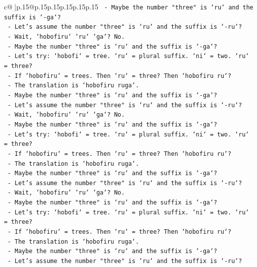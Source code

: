 \documentclass{article}
\begin{document}
{\begin{supertabular}{c@{$\;$}|p{.15\linewidth}@{}p{.15\linewidth}p{.15\linewidth}p{.15\linewidth}p{.15\linewidth}p{.15\linewidth}}
{{{\texttt{    {-} Maybe the number "three" is `ru` and the suffix is `{-}ga`?} \\
\texttt{    {-} Let's assume the number "three" is `ru` and the suffix is `{-}ru`?} \\
\texttt{    {-} Wait, `hobofiru` `ru` `ga`? No.} \\
\texttt{    {-} Maybe the number "three" is `ru` and the suffix is `{-}ga`?} \\
\texttt{    {-} Let's try: `hobofi` = tree. `ru` = plural suffix. `ni` = two. `ru` = three?} \\
\texttt{    {-} If `hobofiru` = trees. Then `ru` = three? Then `hobofiru ru`?} \\
\texttt{    {-} The translation is `hobofiru ruga`.} \\
\texttt{    {-} Maybe the number "three" is `ru` and the suffix is `{-}ga`?} \\
\texttt{    {-} Let's assume the number "three" is `ru` and the suffix is `{-}ru`?} \\
\texttt{    {-} Wait, `hobofiru` `ru` `ga`? No.} \\
\texttt{    {-} Maybe the number "three" is `ru` and the suffix is `{-}ga`?} \\
\texttt{    {-} Let's try: `hobofi` = tree. `ru` = plural suffix. `ni` = two. `ru` = three?} \\
\texttt{    {-} If `hobofiru` = trees. Then `ru` = three? Then `hobofiru ru`?} \\
\texttt{    {-} The translation is `hobofiru ruga`.} \\
\texttt{    {-} Maybe the number "three" is `ru` and the suffix is `{-}ga`?} \\
\texttt{    {-} Let's assume the number "three" is `ru` and the suffix is `{-}ru`?} \\
\texttt{    {-} Wait, `hobofiru` `ru` `ga`? No.} \\
\texttt{    {-} Maybe the number "three" is `ru` and the suffix is `{-}ga`?} \\
\texttt{    {-} Let's try: `hobofi` = tree. `ru` = plural suffix. `ni` = two. `ru` = three?} \\
\texttt{    {-} If `hobofiru` = trees. Then `ru` = three? Then `hobofiru ru`?} \\
\texttt{    {-} The translation is `hobofiru ruga`.} \\
\texttt{    {-} Maybe the number "three" is `ru` and the suffix is `{-}ga`?} \\
\texttt{    {-} Let's assume the number "three" is `ru` and the suffix is `{-}ru`?} \\
}}}
\end{supertabular}}
\end{document}
